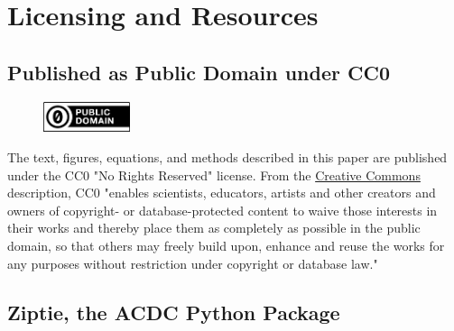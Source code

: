\section{Licensing and Resources}
\label{sec:license}

\subsection{Published as Public Domain under CC0}
\label{subsec:cc0}

\begin{figure}[ht]
\vskip 0.2in
\begin{center}
\centerline{\includegraphics[width=1.0in]{images/cc-zero.png}}
\label{fig:cc0}
\end{center}
\vskip -0.2in
\end{figure}

The text, figures, equations, and methods described in this paper
are published under the CC0 "No Rights Reserved" license.
From the
\href{https://creativecommons.org/public-domain/cc0/}{Creative Commons} description,
CC0 "enables scientists, educators,
artists and other creators and owners of copyright- or database-protected
content to waive those interests in their works and thereby place them as
completely as possible in the public domain, so that others may freely
build upon, enhance and reuse the works for any purposes without restriction
under copyright or database law."

\subsection{Ziptie, the ACDC Python Package}
\label{subsec:python}
